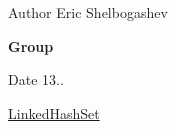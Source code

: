 \label{index_md_README}%
%
\begin{DoxyAuthor}{Author}
Eric Shelbogashev
\end{DoxyAuthor}
{\bfseries{Group}} ~

\begin{DoxyDate}{Date}
13..
\end{DoxyDate}
\mbox{\hyperlink{classLinkedHashSet}{Linked\+Hash\+Set}} 